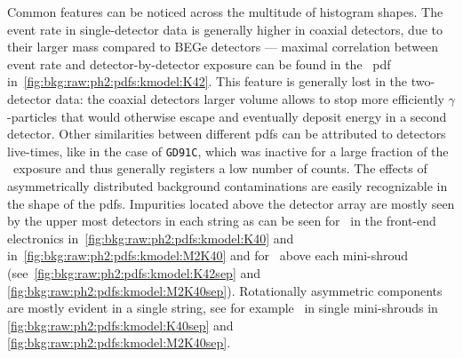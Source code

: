 Common features can be noticed across the multitude of histogram shapes.
The event rate in single-detector data is generally higher in coaxial
detectors, due to their larger mass compared to BEGe detectors ---
maximal correlation between event rate and detector-by-detector exposure
can be found in the \nnbb\ pdf in~\cref{fig:bkg:raw:ph2:pdfs:kmodel:K42}. This
feature is generally lost in the two-detector data: the coaxial
detectors larger volume allows to stop more efficiently
$\gamma$-particles that would otherwise escape and eventually deposit
energy in a second detector. Other similarities between different pdfs
can be attributed to detectors live-times, like in the case of
\texttt{GD91C}, which was inactive for a large fraction of the
\phasetwo\ exposure and thus generally registers a low number of counts.
The effects of asymmetrically distributed background contaminations are
easily recognizable in the shape of the pdfs.  Impurities located above
the detector array are mostly seen by the upper most detectors in each
string as can be seen for \kvn\ in the front-end electronics
in~\cref{fig:bkg:raw:ph2:pdfs:kmodel:K40} and
in~\cref{fig:bkg:raw:ph2:pdfs:kmodel:M2K40} and for \kvz\ above each
mini-shroud (see~\cref{fig:bkg:raw:ph2:pdfs:kmodel:K42sep} and
\cref{fig:bkg:raw:ph2:pdfs:kmodel:M2K40sep}). Rotationally asymmetric
components are mostly evident in a single string, see for example \kvn\
in single mini-shrouds in \cref{fig:bkg:raw:ph2:pdfs:kmodel:K40sep} and
\cref{fig:bkg:raw:ph2:pdfs:kmodel:M2K40sep}.

